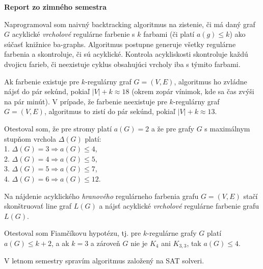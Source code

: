 \documentclass[11pt]{article}
\begin{document}
\begin{center}
{\Large\textbf{Report zo zimného semestra}}
\end{center}

Naprogramoval som naivný backtracking algoritmus na zistenie, či má daný graf $G$ acyklické \textit{vrcholové} regulárne farbenie s $k$ farbami (či platí $a(g) \leq k$) ako súčasť knižnice ba-graphs. Algoritmus postupne generuje všetky regulárne farbenia a skontroluje, či sú acyklické. Kontrola acykliskosti skontroluje každú dvojicu farieb, či neexistuje cyklus obsahujúci vrcholy iba s týmito farbami.

Ak farbenie existuje pre $k$-regulárny graf $G = (V, E)$, algoritmus ho zvládne nájsť do pár sekúnd, pokiaľ $|V| + k \approx 18$ (okrem zopár vínimok, kde sa čas zvýši na pár minút). V prípade, že farbenie neexistuje pre $k$-regulárny graf $G = (V, E)$, algoritmus to zistí do pár sekúnd, pokiaľ $|V| + k \approx 13$.

Otestoval som, že pre stromy platí $a(G) = 2$ a že pre grafy $G$ s maximálnym stupňom vrchola $\Delta (G)$ platí: \\
1. $\Delta(G) = 3 \Rightarrow a(G) \leq 4$, \\
2. $\Delta(G) = 4 \Rightarrow a(G) \leq 5$, \\
3. $\Delta(G) = 5 \Rightarrow a(G) \leq 7$, \\
4. $\Delta(G) = 6 \Rightarrow a(G) \leq 12$.

Na nájdenie acyklického \textit{hranového} regulárneho farbenia grafu $G = (V, E)$ stačí skonštruovať line graf $L(G)$ a nájsť acyklické \textit{vrcholové} regulárne farbenie grafu $L(G)$.

Otestoval som Fiamčíkovu hypotézu, tj. pre $k$-regulárne grafy $G$ platí $a(G) \leq k+2$, a ak $k=3$ a zároveň $G$ nie je $K_4$ ani $K_{3, 3}$, tak $a(G) \leq 4$.


V letnom semestry spravím algoritmus založený na SAT solveri.
\end{document}
